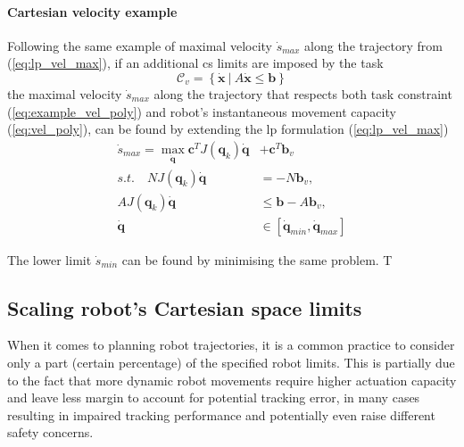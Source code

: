 \paragraph*{Cartesian velocity example} Following the same example of maximal velocity $\dot{s}_{max}$ along the trajectory from (\ref{eq:lp_vel_max}), if an additional \gls{cs} limits are imposed by the task 
\begin{equation}
\mathcal{C}_v = \left\{ \dot{\bm{x}} ~|~ A \dot{\bm{x}} \leq \bm{b} \right\}
\label{eq:example_vel_poly}
\end{equation}
the maximal velocity $\dot{s}_{max}$ along the trajectory that respects both task constraint (\ref{eq:example_vel_poly}) and robot's instantaneous movement capacity (\ref{eq:vel_poly}), can be found by extending the \gls{lp} formulation (\ref{eq:lp_vel_max})
\begin{equation}
\begin{split}
    \dot{s}_{max} = \max_{\dot{\bm{q}}} \bm{c}^TJ(\bm{q}_k)\dot{\bm{q}} &+ \bm{c}^T\bm{b}_v  \\
    s.t.\quad NJ(\bm{q}_k)\dot{\bm{q}} &= - N\bm{b}_v, \\
    AJ(\bm{q}_k)\dot{\bm{q}} &\leq \bm{b} - A\bm{b}_v, \\
    \dot{\bm{q}}&\in [\dot{\bm{q}}_{min}, \dot{\bm{q}}_{max}]
\end{split}\label{eq:lp_vel_max_additional}
\end{equation}

The lower limit $\dot{s}_{min}$ can be found by minimising the same problem. T


\subsection{Scaling robot's Cartesian space limits}

When it comes to planning robot trajectories, it is a common practice to consider only a part (certain percentage) of the specified robot limits. This is partially due to the fact that more dynamic robot movements require higher actuation capacity and leave less margin to account for potential tracking error, in many cases resulting in impaired tracking performance and potentially even raise different safety concerns.

